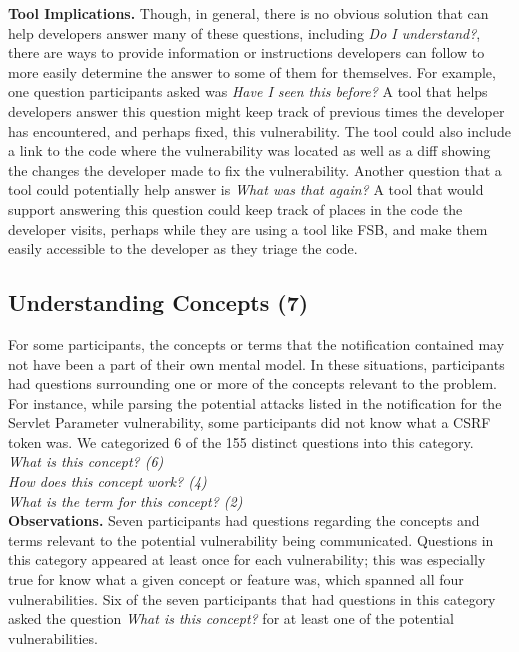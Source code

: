 \documentclass[conference]{IEEEtran}
\begin{document}
\noindent\textbf{Tool Implications.}
Though, in general, there is no obvious solution that can help developers answer many of these questions, including \textit{Do I understand?}, there are ways to provide information or instructions developers can follow to more easily determine the answer to some of them for themselves. 
For example, one question participants asked was \textit{Have I seen this before?}
A tool that helps developers answer this question might keep track of previous times the developer has encountered, and perhaps fixed, this vulnerability. 
The tool could also include a link to the code where the vulnerability was located as well as a diff showing the changes the developer made to fix the vulnerability.
Another question that a tool could potentially help answer is \textit{What was that again?} 
A tool that would support answering this question could keep track of places in the code the developer visits, perhaps while they are using a tool like FSB, and make them easily accessible to the developer as they triage the code.




\noindent\subsection{\textbf{Understanding Concepts (7)}}\label{uc}

For some participants, the concepts or terms that the notification contained may not have been a part of their own mental model. 
In these situations, participants had questions surrounding one or more of the concepts relevant to the problem.
For instance, while parsing the potential attacks listed in the notification for the Servlet Parameter vulnerability, some participants did not know what a CSRF token was.
We categorized 6 of the 155 distinct questions into this category. 
\\

\noindent\emph{What is this concept? (6)} \\
\emph{How does this concept work? (4)} \\
\emph{What is the term for this concept? (2)} \\


\noindent\textbf{Observations.}
Seven participants had questions regarding the concepts and terms relevant to the potential vulnerability being communicated. 
Questions in this category appeared at least once for each vulnerability; this was especially true for know what a given concept or feature was, which spanned all four vulnerabilities. 
Six of the seven participants that had questions in this category asked the question \textit{What is this concept?} for at least one of the potential vulnerabilities.
\end{document}
